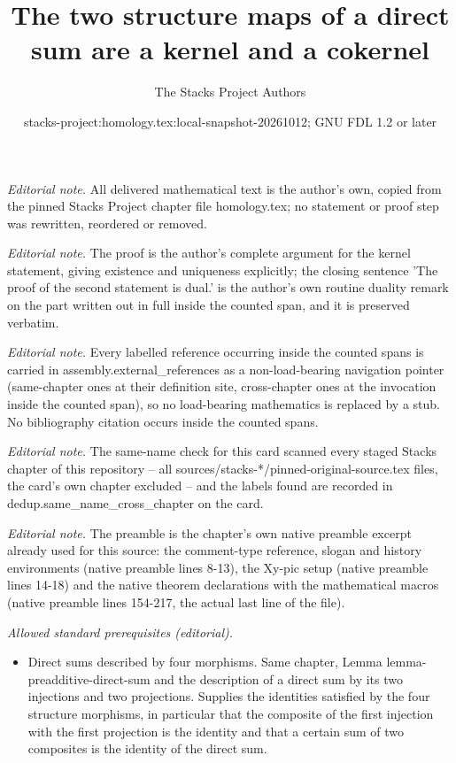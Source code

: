 \documentclass[10pt,a4paper]{amsart}
\title{The two structure maps of a direct sum are a kernel and a cokernel}
\author{The Stacks Project Authors}
\date{stacks-project:homology.tex:local-snapshot-20261012; GNU FDL 1.2 or later}
\theoremstyle{plain}
\theoremstyle{definition}
\theoremstyle{remark}
\numberwithin{equation}{subsection}
\begin{document}
\maketitle
\noindent\textit{Editorial note.} All delivered mathematical text is the author's own, copied from the pinned Stacks Project chapter file homology.tex; no statement or proof step was rewritten, reordered or removed.\par\medskip
\noindent\textit{Editorial note.} The proof is the author's complete argument for the kernel statement, giving existence and uniqueness explicitly; the closing sentence 'The proof of the second statement is dual.' is the author's own routine duality remark on the part written out in full inside the counted span, and it is preserved verbatim.\par\medskip
\noindent\textit{Editorial note.} Every labelled reference occurring inside the counted spans is carried in assembly.external\_references as a non-load-bearing navigation pointer (same-chapter ones at their definition site, cross-chapter ones at the invocation inside the counted span), so no load-bearing mathematics is replaced by a stub. No bibliography citation occurs inside the counted spans.\par\medskip
\noindent\textit{Editorial note.} The same-name check for this card scanned every staged Stacks chapter of this repository -- all sources/stacks-*/pinned-original-source.tex files, the card's own chapter excluded -- and the labels found are recorded in dedup.same\_name\_cross\_chapter on the card.\par\medskip
\noindent\textit{Editorial note.} The preamble is the chapter's own native preamble excerpt already used for this source: the comment-type reference, slogan and history environments (native preamble lines 8-13), the Xy-pic setup (native preamble lines 14-18) and the native theorem declarations with the mathematical macros (native preamble lines 154-217, the actual last line of the file).\par\medskip
\noindent\textit{Allowed standard prerequisites (editorial).}\begin{itemize}
\item Direct sums described by four morphisms. Same chapter, Lemma lemma-preadditive-direct-sum and the description of a direct sum by its two injections and two projections. Supplies the identities satisfied by the four structure morphisms, in particular that the composite of the first injection with the first projection is the identity and that a certain sum of two composites is the identity of the direct sum.
\end{itemize}\medskip
\end{document}
